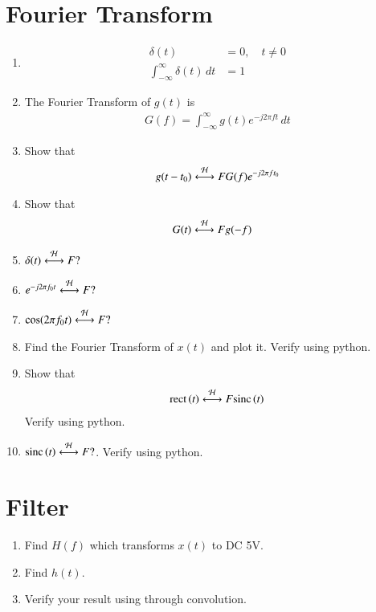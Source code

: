 \documentclass[journal,12pt,twocolumn]{IEEEtran}
\renewcommand\thesection{\arabic{section}}
\begin{document}
\section{Fourier Transform}
\begin{enumerate}[label=\thesection.\arabic*
	,ref=\thesection.\theenumi]
	\item 
		\begin{align}
			\delta(t)&=0, \quad t\neq 0\\
			\int_{-\infty}^{\infty}\delta(t) \, dt&= 1
		\end{align}
	 \item The Fourier Transform of $g(t)$ is
	 \begin{align}
	 G(f)=\int_{-\infty}^{\infty}g(t)e^{-j2\pi ft}\,dt
	 \end{align}
	 \item Show that 
	 \begin{align}
		 g(t-t_0)&\overset{\mathcal{H}}{ \longleftrightarrow}{F}G(f)e^{-j2\pi ft_0}\\
	 \end{align}
	 \item Show that 
	 \begin{align}
		 G(t)&\overset{\mathcal{H}}{ \longleftrightarrow}{F}g(-f)
	 \end{align}
	 \item $\delta(t)\overset{\mathcal{H}}{ \longleftrightarrow}{F}?$
	 \item $e^{-j2\pi f_0t}\overset{\mathcal{H}}{ \longleftrightarrow}{F}?$
	 \item $\cos(2\pi f_0t)\overset{\mathcal{H}}{ \longleftrightarrow}{F}?$
	 \item Find the Fourier Transform of $x(t)$ and plot it.  Verify using python.
	 \item Show that 
	 \begin{align}
		 \text{rect}\left(t\right) \overset{\mathcal{H}}{ \longleftrightarrow}{F} \text{sinc}\left(t\right)
	 \end{align}
	 Verify using python.
	 \item $\text{sinc}\left(t\right)\overset{\mathcal{H}}{ \longleftrightarrow}{F} ?$.  Verify using python.
	\end{enumerate}

	\section{Filter}

\begin{enumerate}[label=\thesection.\arabic*
	,ref=\thesection.\theenumi]
	\item Find $H(f)$ which transforms $x(t)$ to DC 5V.
	\item Find $h(t)$.
	\item Verify your result using  through convolution.
	\end{enumerate}
\end{document}
